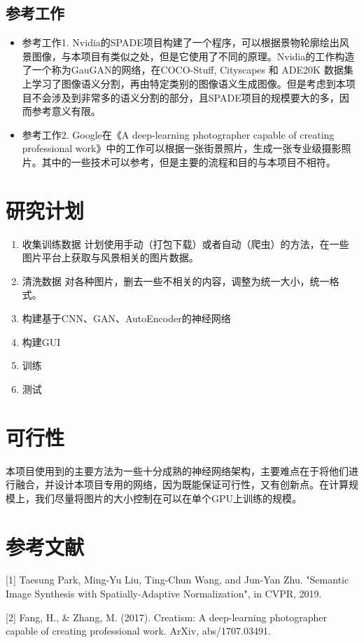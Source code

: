 \documentclass{article}
\begin{document}
\subsection{参考工作}

\begin{itemize}

\item 参考工作1.
Nvidia的SPADE项目构建了一个程序，可以根据景物轮廓绘出风景图像，与本项目有类似之处，但是它使用了不同的原理。Nvidia的工作构造了一个称为GauGAN的网络，在COCO-Stuff, Cityscapes 和 ADE20K 数据集上学习了图像语义分割，再由特定类别的图像语义生成图像。但是考虑到本项目不会涉及到非常多的语义分割的部分，且SPADE项目的规模要大的多，因而参考意义有限。
\item 参考工作2.
Google在《A deep-learning photographer capable of creating professional work》中的工作可以根据一张街景照片，生成一张专业级摄影照片。其中的一些技术可以参考，但是主要的流程和目的与本项目不相符。
\end{itemize}

\section{研究计划}

\begin{enumerate}
	\item 收集训练数据
	计划使用手动（打包下载）或者自动（爬虫）的方法，在一些图片平台上获取与风景相关的图片数据。
	\item 清洗数据
	对各种图片，删去一些不相关的内容，调整为统一大小，统一格式。
	\item 构建基于CNN、GAN、AutoEncoder的神经网络
	\item 构建GUI
	\item 训练
	\item 测试
\end{enumerate}

\section{可行性}
本项目使用到的主要方法为一些十分成熟的神经网络架构，主要难点在于将他们进行融合，并设计本项目专用的网络，因为既能保证可行性，又有创新点。在计算规模上，我们尽量将图片的大小控制在可以在单个GPU上训练的规模。

\section{参考文献}
[1] Taesung Park, Ming-Yu Liu, Ting-Chun Wang, and Jun-Yan Zhu.
"Semantic Image Synthesis with Spatially-Adaptive Normalization", in CVPR, 2019.

[2] Fang, H., & Zhang, M. (2017). Creatism: A deep-learning photographer capable of creating professional work. ArXiv, abs/1707.03491.
\end{document}
